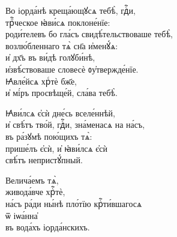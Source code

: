 \documentclass{article}
\begin{document}
%
Во іѻрда́нѣ креща́ющꙋсѧ тебѣ̀, гдⷭ҇и,\\
трⷪ҇ческое ꙗ҆ви́сѧ поклоне́нїе:\\
роди́телевъ бо гла́съ свидѣ́тельствоваше тебѣ̀,\\
возлю́бленнаго тѧ̀ сн҃а и҆менꙋ́ѧ:\\
и҆ дх҃ъ въ ви́дѣ голꙋби́нѣ,\\
и҆звѣ́ствоваше словесѐ ᲂу҆твержде́нїе.\\
Ꙗ҆вле́йсѧ хрⷭтѐ бж҃е,\\
и҆ мі́ръ просвѣще́й, сла́ва тебѣ̀.

Ꙗ҆ви́лсѧ є҆сѝ дне́сь вселе́ннѣй,\\
и҆ свѣ́тъ тво́й, гдⷭ҇и, зна́менасѧ на на́съ,\\
въ ра́зꙋмѣ пою́щихъ тѧ̀:\\
прише́лъ є҆сѝ, и҆ ꙗ҆ви́лсѧ є҆сѝ\\
свѣ́тъ непристꙋ́пный.

Велича́емъ тѧ̀,\\
живода́вче хрⷭ҇тѐ,\\
на́съ ра́ди ны́нѣ пло́тїю крⷭ҇ти́вшагосѧ\\
ѿ іѡа́нна҆\\
въ вода́хъ іѻрда́нскихъ. 
\end{document}
